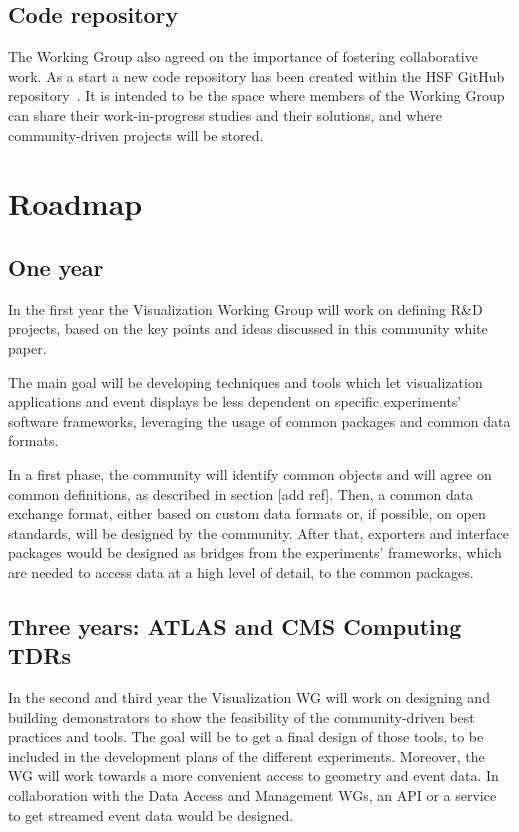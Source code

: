 \documentclass[12pt,a4paper]{article}
\begin{document}
\hypertarget{repo}{%
\subsection{Code repository}\label{repo}}

The Working Group also agreed on the importance of fostering collaborative work.
As a start a new code repository has been created within the HSF GitHub repository~\cite{HSFVizRepo}.
It is intended to be the space where members of the Working Group can share their work-in-progress studies and their solutions, and where
community-driven projects will be stored.

\hypertarget{roadmap}{%
\section{Roadmap}\label{roadmap}}

\hypertarget{one-year}{%
\subsection{One year}\label{one-year}}

In the first year the Visualization Working Group will work on defining R{\&}D projects, based on the key
points and ideas discussed in this community white paper.

The main goal will be developing techniques and tools which let visualization applications and event displays be
less dependent on specific experiments’ software frameworks, leveraging the usage of common packages and common data formats.

In a first phase, the community will identify common objects and will agree on common definitions, as described in
section [add ref]. Then, a common data exchange format, either based on custom data formats or, if possible, on
open standards, will be designed by the community. After that, exporters and interface packages would be designed
as bridges from the experiments’ frameworks, which are needed to access data at a high level of detail, to the common packages.

\hypertarget{three-year}{%
\subsection{Three years: ATLAS and CMS Computing TDRs}\label{three-year}}

In the second and third year the Visualization WG will work on designing and building demonstrators to show the feasibility of
the community-driven best practices and tools. The goal will be to get a final design of those tools, to be included in the development
plans of the different experiments. Moreover, the WG will work towards a more convenient access to geometry and event data.
In collaboration with the Data Access and Management WGs, an API or a service to get streamed event data would be designed.
\end{document}
